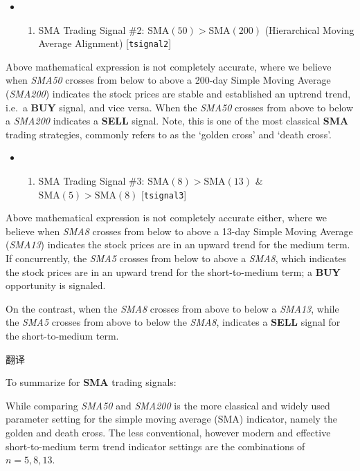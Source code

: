 \documentclass[
]{book}
\providecommand{\tightlist}{%
  \setlength{\itemsep}{0pt}\setlength{\parskip}{0pt}}
\begin{document}
\begin{itemize}
\item
  \begin{enumerate}
  \def\labelenumi{\arabic{enumi}.}
  \setcounter{enumi}{1}
  \tightlist
  \item
    SMA Trading Signal \#2: \(\text{SMA}(50)>\text{SMA}(200)\)
    (Hierarchical Moving Average Alignment) {[}\texttt{tsignal2}{]}
  \end{enumerate}
\end{itemize}

Above mathematical expression is not completely accurate, where we
believe when \emph{SMA50} crosses from below to above a 200-day Simple
Moving Average (\emph{SMA200}) indicates the stock prices are stable and
established an uptrend trend, i.e.~a \textbf{BUY} signal, and vice
versa. When the \emph{SMA50} crosses from above to below a \emph{SMA200}
indicates a \textbf{SELL} signal. Note, this is one of the most
classical \textbf{SMA} trading strategies, commonly refers to as the
`golden cross' and `death cross'.

\begin{itemize}
\item
  \begin{enumerate}
  \def\labelenumi{\arabic{enumi}.}
  \setcounter{enumi}{2}
  \tightlist
  \item
    SMA Trading Signal \#3: \(\text{SMA}(8)>\text{SMA}(13)\) \&
    \(\text{SMA}(5)>\text{SMA}(8)\) {[}\texttt{tsignal3}{]}
  \end{enumerate}
\end{itemize}

Above mathematical expression is not completely accurate either, where
we believe when \emph{SMA8} crosses from below to above a 13-day Simple
Moving Average (\emph{SMA13}) indicates the stock prices are in an
upward trend for the medium term. If concurrently, the \emph{SMA5}
crosses from below to above a \emph{SMA8}, which indicates the stock
prices are in an upward trend for the short-to-medium term; a
\textbf{BUY} opportunity is signaled.

On the contrast, when the \emph{SMA8} crosses from above to below a
\emph{SMA13}, while the \emph{SMA5} crosses from above to below the
\emph{SMA8}, indicates a \textbf{SELL} signal for the short-to-medium
term.

翻译

To summarize for \textbf{SMA} trading signals:

While comparing \emph{SMA50} and \emph{SMA200} is the more classical and
widely used parameter setting for the simple moving average (SMA)
indicator, namely the golden and death cross. The less conventional,
however modern and effective short-to-medium term trend indicator
settings are the combinations of \(n=5,8,13\).
\end{document}
